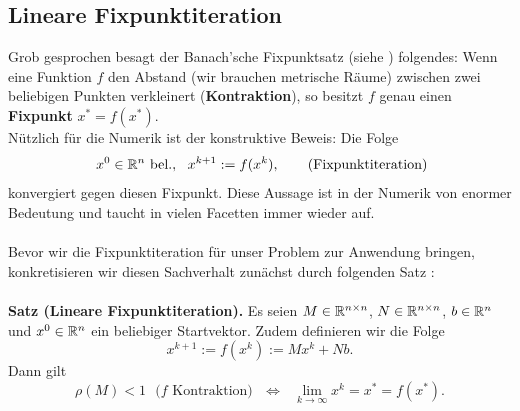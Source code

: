 \subsection{Lineare Fixpunktiteration}
Grob gesprochen besagt der Banach'sche Fixpunktsatz (siehe \cite[Kap. 2.4]{Meister}) folgendes: Wenn eine Funktion $f$ den Abstand (wir brauchen metrische Räume) zwischen zwei beliebigen Punkten verkleinert (\textbf{Kontraktion}), so besitzt $f$ genau einen \textbf{Fixpunkt} $x^* = f(x^*)$.\\
Nützlich für die Numerik ist der konstruktive Beweis: Die Folge
$$~x^0\in{\mathbb{R}}^{n}~\text{bel.},~~x^{k+1} := f(x^k),~  ~~~~~\text{(Fixpunktiteration)}$$
konvergiert gegen diesen Fixpunkt. Diese Aussage ist in der Numerik von enormer Bedeutung und taucht in vielen Facetten immer wieder auf.\\~\\
Bevor wir die Fixpunktiteration für unser Problem zur Anwendung bringen, konkretisieren wir diesen Sachverhalt zunächst durch folgenden Satz \cite[Satz 4.5]{Meister}:\\~\\
\textbf{Satz (Lineare Fixpunktiteration).} Es seien $M\in {\mathbb{R}}^{n\times n}$, $N\in {\mathbb{R}}^{n\times n}$, $b\in {\mathbb{R}}^{n}$ und $x^0\in{\mathbb{R}}^{n}$ ein beliebiger Startvektor. Zudem definieren wir die Folge $$x^{k+1} := f(x^k) := Mx^k + Nb. $$
Dann gilt
$$ \rho(M)<1~~~ \text{($f$ Kontraktion)} ~~~\Leftrightarrow~~~\lim_{k \to \infty}x^k =x^* = f(x^*). $$

